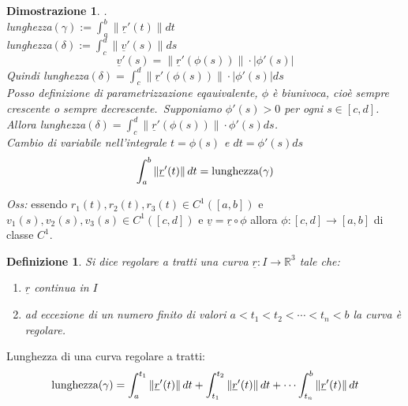 \documentclass{scrreprt}
\newtheorem{defn}{Definizione}
\newenvironment{definition}{\begin{mdframed}[backgroundcolor=Ivory2]\begin{defn}}{\end{defn}\end{mdframed}}
\newtheorem{demnstrn}{Dimostrazione}
\newenvironment{dimostrazione}{\begin{mdframed}[backgroundcolor=LightCyan1]\begin{demnstrn}}{\end{demnstrn}\end{mdframed}}
\begin{document}
\begin{dimostrazione}.\\
	lunghezza$(\gamma) := \int_a^b \left\lVert \underline{r}'(t) \right\rVert dt$\\
	lunghezza$(\delta) := \int_c^d \left\lVert \underline{v}'(s) \right\rVert ds$\\
	\begin{equation}
		\underline{v}'(s) = \left\lVert \underline{r}'(\phi(s))\right\rVert  \cdot \left\lvert \phi'(s)\right\rvert 
	\end{equation}
	Quindi lunghezza$(\delta) = \int_c^d \left\lVert \underline{r}'(\phi(s))\right\rVert  \cdot \left\lvert \phi'(s)\right\rvert ds$\\
	Posso definizione di parametrizzazione eqauivalente, $\phi$ è biunivoca, cioè sempre crescente o sempre decrescente.\
	Supponiamo $\phi'(s) > 0$ per ogni $s \in [c,d]$.\\
	Allora lunghezza$(\delta) = \int_c^d \left\lVert \underline{r}'(\phi(s))\right\rVert  \cdot \phi'(s) ds$.\\
	Cambio di variabile nell'integrale $t=\phi(s)$ e $dt = \phi'(s) ds$\\
	\begin{equation}
		\int_a^b \left\lVert \underline{r}'(t) \right\rVert dt = \textnormal{lunghezza}(\gamma)
	\end{equation}
\end{dimostrazione}
\emph{Oss:} essendo $r_1(t), r_2(t), r_3(t) \in C^1([a,b])$ e $v_1(s), v_2(s), v_3(s) \in C^1([c,d])$ e $\underline{v} = \underline{r} \circ \phi$ allora $\phi: [c,d] \rightarrow [a,b]$ di classe $C^1$.
\begin{definition}
	Si dice regolare a tratti una curva $\underline{r}: I \rightarrow \mathbb{R}^3$ tale che:
	\begin{enumerate}
		\item[$i$)] $ \underline{r}$ continua in $I$
		\item[$ii$)] ad eccezione di un numero finito di valori $a < t_1 < t_2 < \cdots < t_n < b$ la curva è regolare.
	\end{enumerate}
\end{definition}

Lunghezza di una curva regolare a tratti:
\begin{equation} %
	\textnormal{lunghezza}(\gamma) = \int_a^{t_1} \left\lVert \underline{r}'(t) \right\rVert dt + \int_{t_1}^{t_2} \left\lVert \underline{r}'(t) \right\rVert dt + \cdots \int_{t_n}^{b} \left\lVert \underline{r}'(t) \right\rVert dt
\end{equation}
\end{document}
